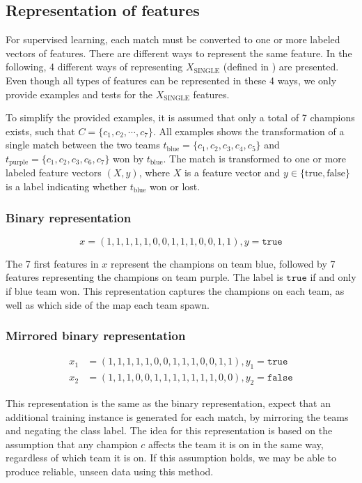 \subsection{Representation of features}
\label{sec:representationoffeatures}
For supervised learning, each match must be converted to one or more labeled vectors of features.
There are different ways to represent the same feature. In the following,
4 different ways of representing $X_\text{SINGLE}$ (defined in ) are presented.
Even though all types of features can be represented in these 4 ways, we only provide examples and tests for the $X_\text{SINGLE}$ features.

To simplify the provided examples, it is assumed that only a total of 7 champions exists, such that $C = \{c_1, c_2, \cdots, c_7\}$.
All examples shows the transformation of a single match between the two teams $t_\text{blue} = \{c_1,c_2,c_3,c_4,c_5\}$ and $t_\text{purple} = \{c_1,c_2,c_3,c_6,c_7\}$ won by $t_\text{blue}$. The match is transformed to one or more labeled feature vectors $(X, y)$, where $X$ is a feature vector and $y \in \{\text{true}, \text{false}\}$ is a label indicating whether $t_\text{blue}$ won or lost.

\subsubsection{Binary representation}

\[ x = (1,1,1,1,1,0,0,1,1,1,0,0,1,1), y = \texttt{true} \]

The 7 first features in $x$ represent the champions on team blue, followed by 7 features representing the champions on team purple. The label is $\texttt{true}$ if and only if blue team won.
This representation captures the champions on each team, as well as which side of the map each team spawn.

\subsubsection{Mirrored binary representation}

\begin{align*}
  x_1 &= (1,1,1,1,1,0,0,1,1,1,0,0,1,1), y_1 = \texttt{true}\\
  x_2 &= (1,1,1,0,0,1,1,1,1,1,1,1,0,0), y_2 = \texttt{false}
\end{align*}

This representation is the same as the binary representation, expect that an additional training instance is generated for each match, by mirroring the teams and negating the class label.
The idea for this representation is based on the assumption that any champion $c$ affects the team it is on in the same way, regardless of which team it is on.
If this assumption holds, we may be able to produce reliable, unseen data using this method.

